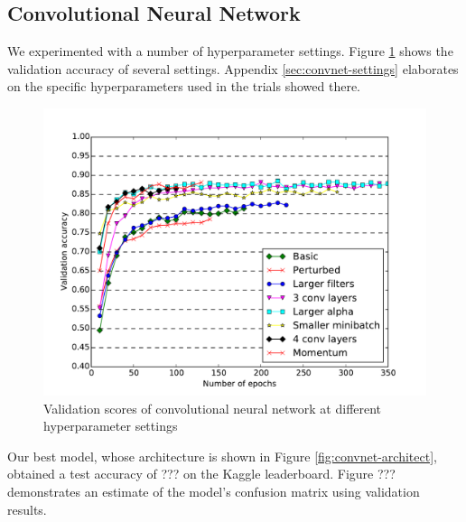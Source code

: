 \documentclass{acm_proc_article-sp}
\begin{document}
\subsection{Convolutional Neural Network}
We experimented with a number of hyperparameter settings. Figure \ref{fig:convnet-compare} shows the validation accuracy of several settings. Appendix \ref{sec:convnet-settings} elaborates on the specific hyperparameters used in the trials showed there.

\begin{figure}[h!]
	\centering
	\includegraphics[width=\linewidth]{convnet_comparison}
  	\caption{Validation scores of convolutional neural network at different hyperparameter settings}
  	\label{fig:convnet-compare}
\end{figure}

Our best model, whose architecture is shown in Figure \ref{fig:convnet-architect}, obtained a test accuracy of ??? on the Kaggle leaderboard. Figure ??? demonstrates an estimate of the model's confusion matrix using validation results.
\end{document}
